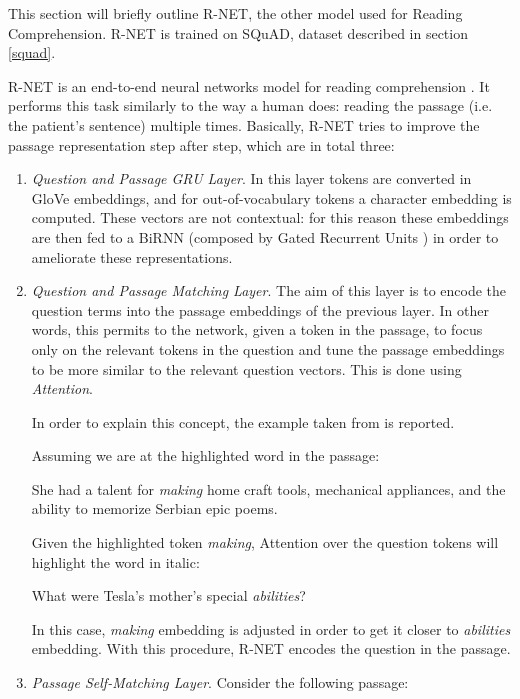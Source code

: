 This section will briefly outline R-NET, the other model used for Reading Comprehension. R-NET is trained on SQuAD, dataset described in section \ref{squad}.

R-NET is an end-to-end neural networks model for reading comprehension \cite{rnet}. It performs this task similarly to the way a human does: reading the passage (i.e. the patient's sentence) multiple times. Basically, R-NET tries to improve the passage representation step after step, which are in total three:
\begin{enumerate}
  \item \textit{Question and Passage GRU Layer}. In this layer tokens are converted in GloVe embeddings, and for out-of-vocabulary tokens a character embedding is computed. These vectors are not contextual: for this reason these embeddings are then fed to a BiRNN (composed by Gated Recurrent Units \cite{gru}) in order to ameliorate these representations.
  \item \textit{Question and Passage Matching Layer}. The aim of this layer is to encode the question terms into the passage embeddings of the previous layer. In other words, this permits to the network, given a token in the passage, to focus only on the relevant tokens in the question and tune the passage embeddings to be more similar to the relevant question vectors. This is done using \textit{Attention}.
  
In order to explain this concept, the example taken from \cite{understandingrnet} is reported.

Assuming we are at the highlighted word in the passage:

\begin{displayquote}
She had a talent for \textit{making} home craft tools, mechanical appliances, and the ability to memorize Serbian epic poems.
\end{displayquote}

Given the highlighted token \textit{making}, Attention over the question tokens will highlight the word in italic:

\begin{displayquote}
What were Tesla's mother's special \textit{abilities}?
\end{displayquote}

In this case, \textit{making} embedding is adjusted in order to get it closer to \textit{abilities} embedding. With this procedure, R-NET encodes the question in the passage.

  \item \textit{Passage Self-Matching Layer}. Consider the following passage:
  

\end{enumerate}

